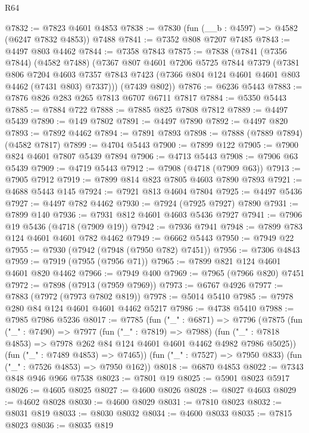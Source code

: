\begin{lexlean}{R64}
\begin{coremodule}
@7832 := @7823 @4601 @4853
@7838 := @7830 (fun (__b : @4597) => @4582 (@6247 @7832 @4853)) @7488
@7841 := @7352 @808 @7207 @7485
@7843 := @4497 @803 @4462
@7844 := @7358 @7843
@7875 := @7838
    (@7841
      (@7356 @7844)
      (@4582 @7488)
      (@7367
        @807
        @4601
        @7206
        @5725
        @7844
        @7379
        (@7381
          @806
          @7204
          @4603
          @7357
          @7843
          @7423
          (@7366 @804 @124 @4601 @4601 @803 @4462 (@7431 @803) @7337)))
      (@7439 @802))
@7876 := @6236 @5443
@7883 := @7876 @826 @283 @265 @7813 @6707 @6711 @7817
@7884 := @5350 @5443
@7885 := @7884 @722
@7888 := @7885 @825 @7808 @7812
@7889 := @4497 @5439
@7890 := @149 @7802
@7891 := @4497 @7890
@7892 := @4497 @820
@7893 := @7892 @4462
@7894 := @7891 @7893
@7898 := @7888 (@7889 @7894) (@4582 @7817)
@7899 := @4704 @5443
@7900 := @7899 @122
@7905 := @7900 @824 @4601 @7807 @5439 @7894
@7906 := @4713 @5443
@7908 := @7906 @63 @5439
@7909 := @4719 @5443
@7912 := @7908 (@4718 (@7909 @63))
@7913 := @7905 @7912
@7919 := @7899 @814 @823 @7805 @4603 @7890 @7893
@7921 := @4688 @5443 @145
@7924 := @7921 @813 @4604 @7804
@7925 := @4497 @5436
@7927 := @4497 @782 @4462
@7930 := @7924 (@7925 @7927) @7890
@7931 := @7899 @140
@7936 := @7931 @812 @4601 @4603 @5436 @7927
@7941 := @7906 @19 @5436 (@4718 (@7909 @19))
@7942 := @7936 @7941
@7948 := @7899 @783 @124 @4601 @4601 @782 @4462
@7949 := @6662 @5443
@7950 := @7949 @22
@7955 := @7930 (@7942 (@7948 (@7950 @782) @7451))
@7956 := @7306 @4843
@7959 := @7919 (@7955 (@7956 @71))
@7965 := @7899 @821 @124 @4601 @4601 @820 @4462
@7966 := @7949 @400
@7969 := @7965 (@7966 @820) @7451
@7972 := @7898 (@7913 (@7959 @7969))
@7973 := @6767 @4926
@7977 := @7883 (@7972 (@7973 @7802 @819))
@7978 := @5014 @5410
@7985 := @7978 @280 @84 @124 @4601 @4601 @4462 @5217
@7986 := @4738 @5410
@7988 := @7985 @7986 @5236
@8017 := @7785
    (fun ("_" : @6871) =>
    @7796
      (@7875
        (fun ("_" : @7490) =>
        @7977
          (fun ("_" : @7819) => @7988)
          (fun ("_" : @7818 @4853) => @7978 @262 @84 @124 @4601 @4601 @4462 @4982 @7986 @5025))
        (fun ("_" : @7489 @4853) => @7465))
      (fun ("_" : @7527) => @7950 @833)
      (fun ("_" : @7526 @4853) => @7950 @162))
@8018 := @6870 @4853
@8022 := @7343 @848 @946 @966 @7538
@8023 := @7801 @19
@8025 := @5901 @8023 @5917
@8026 := @4605 @8025
@8027 := @4600 @8026
@8028 := @8027 @4603
@8029 := @4602 @8028
@8030 := @4600 @8029
@8031 := @7810 @8023
@8032 := @8031 @819
@8033 := @8030 @8032
@8034 := @4600 @8033
@8035 := @7815 @8023
@8036 := @8035 @819

\end{coremodule}
\end{lexlean}
